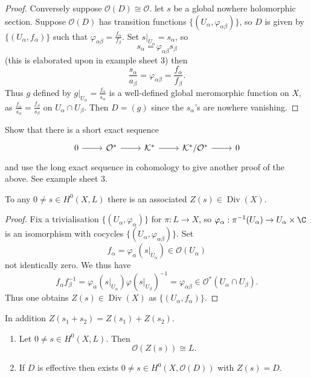 \documentclass[a4paper]{article}
\DeclareMathOperator{\Div}{Div} %
\begin{document}
\begin{proof}
  Conversely suppose \(\mathcal O(D) \cong \mathcal O\). let \(s\) be a global nowhere holomorphic section. Suppose \(\mathcal O(D)\) has transition functions \(\{(U_\alpha, \varphi_{\alpha\beta})\}\), so \(D\) is given by \(\{(U_\alpha, f_\alpha)\}\) such that \(\varphi_{\alpha\beta} = \frac{f_\alpha}{f_\beta}\). Set \(s|_{U_\alpha} = s_\alpha\), so
  \[
    s_\alpha = \varphi_{\alpha\beta} s_\beta
  \]
  (this is elaborated upon in example sheet 3) then
  \[
    \frac{s_\alpha}{a_\beta} = \varphi_{\alpha\beta} = \frac{f_\alpha}{f_\beta}.
  \]
  Thus \(g\) defined by \(g|_{U_\alpha} = \frac{f_\alpha}{s_\alpha}\) is a well-defined global meromorphic function on \(X\), as \(\frac{f_\alpha}{s_\alpha} = \frac{f_\beta}{s_\beta}\) on \(U_\alpha \cap U_\beta\). Then \(D = (g)\) since the \(s_\alpha\)'s are nowhere vanishing.
\end{proof}

\begin{ex}
  Show that there is a short exact sequence
  \[
    \begin{tikzcd}
      0 \ar[r] & \mathcal O^* \ar[r] & \mathcal K^* \ar[r] & \mathcal K^*/\mathcal O^* \ar[r] & 0
    \end{tikzcd}
  \]
  and use the long exact sequence in cohomology to give another proof of the above. See example sheet 3.
\end{ex}

\begin{proposition}
  To any \(0 \neq s \in H^0(X, L)\) there is an associated \(Z(s) \in \Div(X)\).
\end{proposition}

\begin{proof}
  Fix a trivialisation \(\{(U_\alpha, \varphi_\alpha)\}\) for \(\pi: L \to X\), so \(\varphi_\alpha: \pi^{-1}(U_\alpha) \to U_\alpha \times \C\) is an isomorphism with cocycles \(\{(U_\alpha, \varphi_{\alpha\beta})\}\). Set
  \[
    f_\alpha = \varphi_\alpha(s|_{U_\alpha}) \in \mathcal O(U_\alpha)
  \]
  not identically zero. We thus have
  \[
    f_\alpha f_\beta^{-1}
    = \varphi_\alpha(s|_{U_\alpha}) \varphi(s|_{U_\beta})^{-1}
    = \varphi_{\alpha\beta} \in \mathcal O^*(U_\alpha \cap U_\beta).
  \]
  Thus one obtains \(Z(s) \in \Div(X)\) as \(\{(U_\alpha, f_\alpha)\}\).
\end{proof}
In addition \(Z(s_1 + s_2) = Z(s_1) + Z(s_2)\).

\begin{proposition}\leavevmode
  \begin{enumerate}
  \item Let \(0 \neq s \in H^0(X, L)\). Then
    \[
      \mathcal O(Z(s)) \cong L.
    \]
  \item If \(D\) is effective then exists \(0 \neq s \in H^0(X, \mathcal O(D))\) with \(Z(s) = D\).
  \end{enumerate}
\end{proposition}
\end{document}
